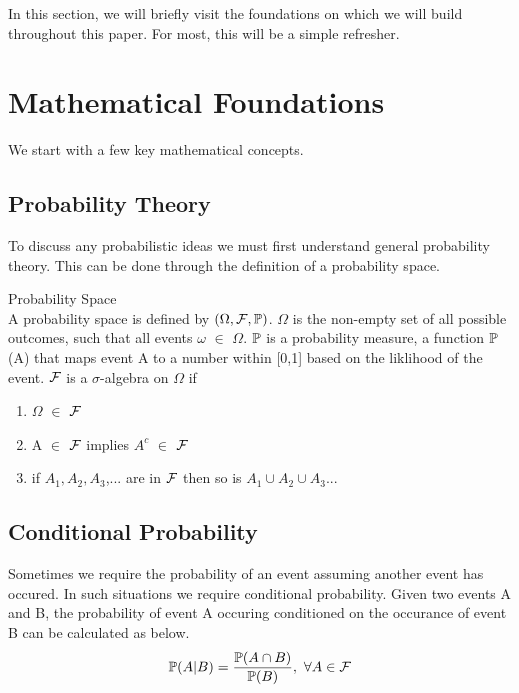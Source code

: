 In this section, we will briefly visit the foundations on which we will build throughout this paper. For most, this will be a simple refresher.

\section{Mathematical Foundations}
We start with a few key mathematical concepts.
\subsection{Probability Theory}
To discuss any probabilistic ideas we must first understand general probability theory. This can be done through the definition of a probability space.
\begin{definition}
	\label{probtheory}
	Probability Space \\
	A probability space is defined by $(\Omega ,\mathcal{F} , \mathbb{P})$. $\Omega$ is the non-empty set of 		all possible outcomes, such that all events $\omega$ $\in$ $\Omega$. $\mathbb{P}$ is a probability				measure, a function $\mathbb{P}$(A) that maps event A to a number within [0,1] based on the liklihood of 		the event. $\mathcal{F}$ is a $\sigma$-algebra on $\Omega$ if

	\begin{enumerate}
		\item $\Omega$ $\in$ $\mathcal{F}$
		\item A $\in$ $\mathcal{F}$ implies $A^c$ $\in$ $\mathcal{F}$
		\item if $A_1, A_2, A_3$,... are in $\mathcal{F}$ then so is $A_1 \cup A_2 \cup A_3$...
	\end{enumerate}
\end{definition}

\subsection{Conditional Probability}
Sometimes we require the probability of an event assuming another event has occured. In such situations we require conditional probability. Given two events A and B, the probability of event A occuring conditioned on the occurance of event B can be calculated as below. \\ 
\begin{equation}
\label{condprob}
	\mathbb{P} (A|B) = \dfrac{\mathbb{P} (A \cap B)}{\mathbb{P} (B)}, \  \forall A \in \mathcal{F}
\end{equation}
\\

